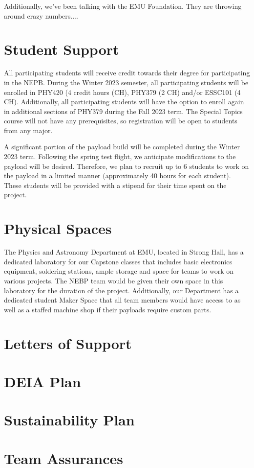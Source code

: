 \documentclass[12pt]{article}
\begin{document}
Additionally, we've been talking with the EMU Foundation. They are throwing around
crazy numbers....

\newpage
\section{Student Support}
All participating students will receive credit towards their degree for
participating in the NEPB. During the Winter 2023 semester, all participating students
will be enrolled in PHY420 (4 credit hours (CH), PHY379 (2 CH) and/or ESSC101 (4 CH).
Additionally, all participating students will have the option to enroll again in
additional sections of PHY379 during the Fall 2023 term. The Special Topics
course will not have any prerequisites, so registration will be open to
students from any major.

A significant portion of the payload build will be completed during the Winter 2023
term. Following the spring test flight, we anticipate modifications to the
payload will be desired. Therefore, we plan to recruit up to 6 students
to work on the payload in a limited manner (approximately 40 hours for each
student). These students will be provided with a
stipend for their time spent on the project.


\section{Physical Spaces}
The Physics and Astronomy Department at EMU, located in Strong Hall, has a dedicated laboratory for our Capstone classes that includes basic electronics equipment, soldering stations, ample storage and space for teams to work on various projects. The NEBP team would be given their own space in this laboratory for the duration of the project. Additionally, our Department has a dedicated student Maker Space that all team members would have access to as well as a staffed machine shop if their payloads require custom parts.


\section{Letters of Support}


\section{DEIA Plan}



\section{Sustainability Plan}

\section{Team Assurances}
\end{document}

